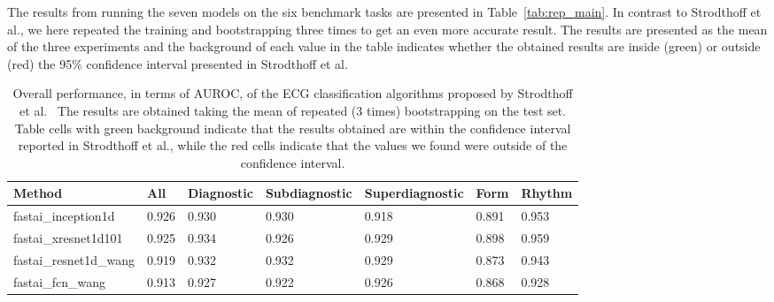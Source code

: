 The results from running the seven models on the six benchmark tasks are presented in Table~\ref{tab:rep_main}. In contrast to Strodthoff et al., we here repeated the training and bootstrapping three times to get an even more accurate result. The results are presented as the mean of the three experiments and the background of each value in the table indicates whether the obtained results are inside (green) or outside (red) the 95\% confidence interval presented in Strodthoff et al. 


\begin{table}[h]
\scriptsize
\caption{Overall performance, in terms of AUROC, of the ECG classification algorithms proposed by Strodthoff et al.~\cite{strodthoff_deep_2021} The results are obtained taking the mean of repeated (3 times) bootstrapping on the test set. Table cells with green background indicate that the results obtained are within the confidence interval reported in Strodthoff et al., while the red cells indicate that the values we found were outside of the confidence interval.}
\begin{tabular}{lllllll}
\cellcolor[HTML]{C0C0C0}\textbf{Method} & \cellcolor[HTML]{C0C0C0}\textbf{All} & \cellcolor[HTML]{C0C0C0}\textbf{Diagnostic} & \cellcolor[HTML]{C0C0C0}\textbf{Subdiagnostic} & \cellcolor[HTML]{C0C0C0}\textbf{Superdiagnostic} & \cellcolor[HTML]{C0C0C0}\textbf{Form} & \cellcolor[HTML]{C0C0C0}\textbf{Rhythm} \\\hline
fastai\_inception1d    & \cellcolor{green!25} 0.926 & \cellcolor{green!25} 0.930 & \cellcolor{green!25} 0.930 & \cellcolor{green!25} 0.918 & \cellcolor{green!25} 0.891 & \cellcolor{green!25} 0.953 \\
fastai\_xresnet1d101   & \cellcolor{green!25} 0.925 & \cellcolor{green!25} 0.934 & \cellcolor{green!25} 0.926 & \cellcolor{green!25} 0.929 & \cellcolor{green!25} 0.898 & \cellcolor{green!25} 0.959 \\
fastai\_resnet1d\_wang & \cellcolor{green!25} 0.919 & \cellcolor{green!25} 0.932 & \cellcolor{green!25} 0.932 & \cellcolor{green!25} 0.929 & \cellcolor{green!25} 0.873 & \cellcolor{green!25} 0.943 \\
fastai\_fcn\_wang      & \cellcolor{green!25} 0.913 & \cellcolor{green!25} 0.927 & \cellcolor{green!25} 0.922 & \cellcolor{green!25} 0.926 & \cellcolor{green!25} 0.868 & \cellcolor{green!25} 0.928 \\

\end{tabular}
\end{table}
